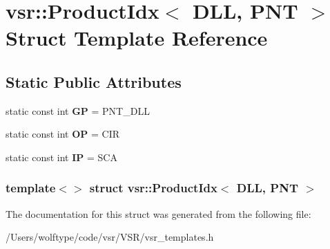 \hypertarget{structvsr_1_1_product_idx_3_01_d_l_l_00_01_p_n_t_01_4}{\section{vsr\-:\-:Product\-Idx$<$ D\-L\-L, P\-N\-T $>$ Struct Template Reference}
\label{structvsr_1_1_product_idx_3_01_d_l_l_00_01_p_n_t_01_4}
}
\subsection*{Static Public Attributes}
\begin{DoxyCompactItemize}
\item 
\hypertarget{structvsr_1_1_product_idx_3_01_d_l_l_00_01_p_n_t_01_4_a9dfec5c3c6fa53b166c5526f0dba03f5}{static const int {\bfseries G\-P} = P\-N\-T\-\_\-\-D\-L\-L}\label{structvsr_1_1_product_idx_3_01_d_l_l_00_01_p_n_t_01_4_a9dfec5c3c6fa53b166c5526f0dba03f5}

\item 
\hypertarget{structvsr_1_1_product_idx_3_01_d_l_l_00_01_p_n_t_01_4_a7c76bbe50e55a65a2e7ccb58359cecac}{static const int {\bfseries O\-P} = C\-I\-R}\label{structvsr_1_1_product_idx_3_01_d_l_l_00_01_p_n_t_01_4_a7c76bbe50e55a65a2e7ccb58359cecac}

\item 
\hypertarget{structvsr_1_1_product_idx_3_01_d_l_l_00_01_p_n_t_01_4_ae7f9659eca31f1e5ed17011c9286ba10}{static const int {\bfseries I\-P} = S\-C\-A}\label{structvsr_1_1_product_idx_3_01_d_l_l_00_01_p_n_t_01_4_ae7f9659eca31f1e5ed17011c9286ba10}

\end{DoxyCompactItemize}
\subsubsection*{template$<$$>$ struct vsr\-::\-Product\-Idx$<$ D\-L\-L, P\-N\-T $>$}



The documentation for this struct was generated from the following file\-:\begin{DoxyCompactItemize}
\item 
/\-Users/wolftype/code/vsr/\-V\-S\-R/vsr\-\_\-templates.\-h\end{DoxyCompactItemize}
